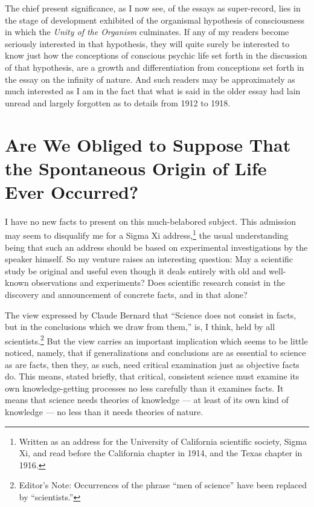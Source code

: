 \documentclass[a4paper, 11pt, oneside, polutonikogreek, english, landscape]{article}
\begin{document}
The chief present significance, as I now see, of the essays as super-record, lies in the stage of development exhibited of the organismal hypothesis of consciousness in which the \emph{Unity of the Organism} culminates. If any of my readers become seriously interested in that hypothesis, they will quite surely be interested to know just how the conceptions of conscious psychic life set forth in the discussion of that hypothesis, are a growth and differentiation from conceptions set forth in the essay on the infinity of nature. And such readers may be approximately as much interested as I am in the fact that what is said in the older essay had lain unread and largely forgotten as to details from 1912 to 1918.
\clearpage
\section{Are We Obliged to Suppose That the Spontaneous Origin of Life Ever Occurred?}
\paragraph{}
I have no new facts to present on this much-belabored subject. This admission may seem to disqualify me for a Sigma Xi address,\footnote{Written as an address for the University of California scientific society, Sigma Xi, and read before the California chapter in 1914, and the Texas chapter in 1916.} the usual understanding being that such an address should be based on experimental investigations by the speaker himself. So my venture raises an interesting question: May a scientific study be original and useful even though it deals entirely with old and well-known observations and experiments? Does scientific research consist in the discovery and announcement of concrete facts, and in that alone?

The view expressed by Claude Bernard that ``Science does not consist in facts, but in the conclusions which we draw from them,'' is, I think, held by all scientists.\footnote{Editor's Note: Occurrences of the phrase ``men of science'' have been replaced by ``scientists.''} But the view carries an important implication which seems to be little noticed, namely, that if generalizations and conclusions are as essential to science as are facts, then they, as such, need critical examination just as objective facts do. This means, stated briefly, that critical, consistent science must examine its own knowledge-getting processes no less carefully than it examines facts. It means that science needs theories of knowledge --- at least of its own kind of knowledge --- no less than it needs theories of nature.
\end{document}
